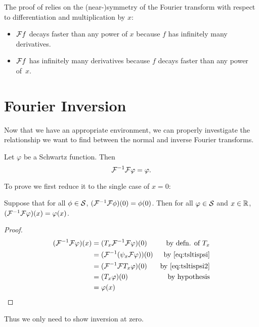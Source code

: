       \begin{rmk}
        The proof of  relies on the (near-)symmetry of the Fourier transform with respect to differentiation and multiplication by $x$:
        \begin{itemize}
          \item $\F f$ decays faster than any power of $x$ because $f$ has infinitely many derivatives.
          \item $\F f$ has infinitely many derivatives because $f$ decays faster than any power of~$x$.
        \end{itemize}
      \end{rmk}

    \section{Fourier Inversion}
      Now that we have an appropriate environment, we can properly investigate the relationship we want to find between the normal and inverse Fourier transforms.
      \begin{thm}
        \label{thm:fourinv}
        Let $\varphi$ be a Schwartz function.
        Then \[\F^{-1}\F \varphi = \varphi\text{.}\]
      \end{thm}
      To prove  we first reduce it to the single case of $x=0$:
      \begin{claim}
        Suppose that for all $\phi\in\S$, $(\F^{-1}\F\phi)(0) = \phi(0)$.
        Then for all $\varphi\in\S$ and $x\in\R$, $(\F^{-1}\F\varphi)(x)=\varphi(x)$.
        \begin{proof}
          \begin{align*}
            (\F^{-1}\F\varphi)(x) &= (T_x\F^{-1}\F\varphi)(0) &\text{by defn. of $T_x$}\\
            &= (\F^{-1}(\psi_x\F\varphi))(0) &\text{by \eqref{eq:tsltispsi}}\\
            &= (\F^{-1}\F T_x\varphi)(0)  &\text{by \eqref{eq:tsltispsi2}}\\
            &= (T_x\varphi)(0) &\text{by hypothesis}\\
            &= \varphi(x)
          \end{align*}
        \end{proof}
      \end{claim}
      Thus we only need to show inversion at zero.

